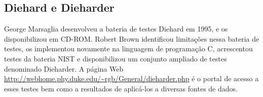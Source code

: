 
\subsection{Diehard e Dieharder}

George Marsaglia desenvolveu a bateria de testes Diehard em 1995, e os disponibilizou em CD-ROM.
Robert Brown identificou limitações nessa bateria de testes, os implementou novamente na linguagem de programação C, acrescentou testes da bateria NIST e disponibilizou um conjunto ampliado de testes denominado Dieharder.
A página Web \url{http://webhome.phy.duke.edu/~rgb/General/dieharder.php} é o portal de acesso a esses testes bem como a resultados de aplicá-los a diversas fontes de dados.


